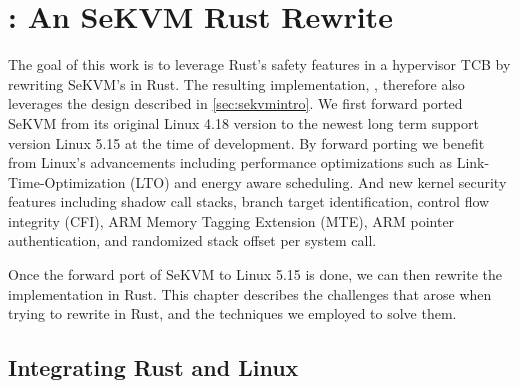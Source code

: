 \chapter{\rustsec{}: An SeKVM Rust Rewrite}
\label{sec:rewrite}


The goal of this work is to leverage Rust's safety features in a hypervisor TCB
by rewriting SeKVM's \secore{} in Rust.
The resulting implementation, \rustsec{}, therefore also leverages the design
described in \autoref{sec:sekvmintro}.
We first forward ported SeKVM from its original
Linux 4.18 version to the newest long term support version Linux 5.15 at the
time of development.
By forward porting we benefit from Linux's advancements including performance
optimizations such as Link-Time-Optimization (LTO) and energy aware scheduling.
And new kernel security features including  shadow call stacks,
branch target identification, control flow integrity (CFI), ARM Memory Tagging
Extension (MTE), ARM pointer authentication, and randomized stack offset per
system call.


Once the forward port of SeKVM to Linux 5.15 is done, we can then rewrite
the implementation in Rust.
This chapter describes the challenges that arose when trying to rewrite
\secore{} in Rust, and the techniques we employed to solve them.

\section{Integrating Rust and Linux}

%

